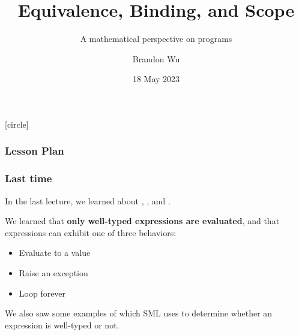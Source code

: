 \documentclass[aspectratio=169, handout]{beamer}
\title{Equivalence, Binding, and Scope} %
\subtitle{A mathematical perspective on programs} %
\date{18 May 2023} %
\author{Brandon Wu} %
\newif\ifcolorlambda
\begin{document}
\ifweb
    \renewcommand{\pause}{}
\fi

[circle]

{
\begin{frame}[plain]
    \colorlambdatrue
    \titlepage
\end{frame}
}

\begin{frame}[fragile]
  \frametitle{Lesson Plan}

  \tableofcontents
\end{frame}

\begin{frame}[fragile]
  \frametitle{Last time}

  In the last lecture, we learned about , , and .

  \pause
  \vspace{5pt}

  We learned that \textbf{only well-typed expressions are evaluated}, and that expressions can
  exhibit one of three behaviors:

  \pause
  \vspace{\fill}

  \begin{itemize}
    \item Evaluate to a value \pause
    \item Raise an exception \pause
    \item Loop forever
  \end{itemize}

  \pause
  \vspace{\fill}

  We also saw some examples of  which SML uses to determine whether
  an expression is well-typed or not.
\end{frame}

\end{document}
